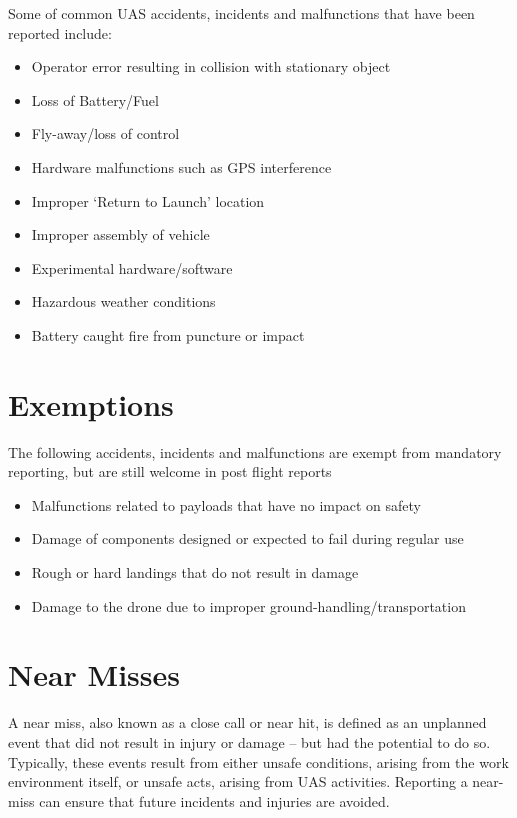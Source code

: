 \documentclass[
]{book}
\providecommand{\tightlist}{%
  \setlength{\itemsep}{0pt}\setlength{\parskip}{0pt}}
\begin{document}
Some of common UAS accidents, incidents and malfunctions that have been reported include:

\begin{itemize}
\tightlist
\item
  Operator error resulting in collision with stationary object
\item
  Loss of Battery/Fuel
\item
  Fly-away/loss of control
\item
  Hardware malfunctions such as GPS interference
\item
  Improper `Return to Launch' location
\item
  Improper assembly of vehicle
\item
  Experimental hardware/software
\item
  Hazardous weather conditions
\item
  Battery caught fire from puncture or impact
\end{itemize}

\hypertarget{s-reporting-exemptions}{%
\section{Exemptions}\label{s-reporting-exemptions}}

The following accidents, incidents and malfunctions are exempt from mandatory reporting, but are still welcome in post flight reports

\begin{itemize}
\tightlist
\item
  Malfunctions related to payloads that have no impact on safety
\item
  Damage of components designed or expected to fail during regular use
\item
  Rough or hard landings that do not result in damage
\item
  Damage to the drone due to improper ground-handling/transportation
\end{itemize}

\hypertarget{s-near-misses}{%
\section{Near Misses}\label{s-near-misses}}

A near miss, also known as a close call or near hit, is defined as an unplanned event that did not result in injury or damage -- but had the potential to do so. Typically, these events result from either unsafe conditions, arising from the work environment itself, or unsafe acts, arising from UAS activities. Reporting a near-miss can ensure that future incidents and injuries are avoided.
\end{document}
